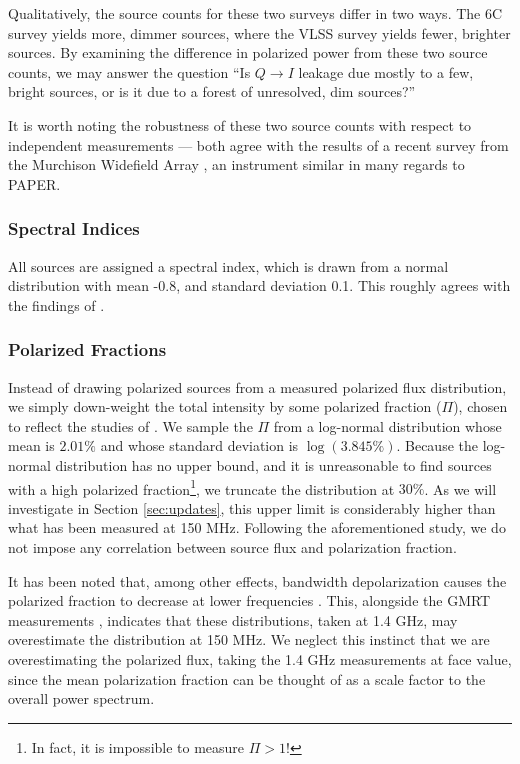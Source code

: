 Qualitatively, the source counts for these two surveys differ in two ways. The 6C survey yields
more, dimmer sources, where the VLSS survey yields fewer, brighter sources. By examining the
difference in polarized power from these two source counts, we may answer the question ``Is $Q\to I$
leakage due mostly to a few, bright sources, or is it due to a forest of unresolved, dim sources?''

It is worth noting the robustness of these two source counts with respect to independent
measurements --- both agree with the results of a recent survey from the Murchison Widefield Array
\cite{Williams2012}, an instrument similar in many regards to PAPER.

\subsubsection*{Spectral Indices}
All sources are assigned a spectral index, which is drawn from a normal distribution with mean -0.8,
and standard deviation 0.1. This roughly agrees with the findings of \citet{Helmboldt2008}.

\subsubsection*{Polarized Fractions}
Instead of drawing polarized sources from a measured polarized flux distribution, we simply
down-weight the total intensity by some polarized fraction ($\Pi$), chosen to reflect the studies 
of \citet{Tucci2012}. We sample the $\Pi$ from a log-normal distribution whose mean is $2.01\%$ and
whose standard deviation is $\log(3.845\%)$. Because the log-normal distribution has no upper bound,
and it is unreasonable to find sources with a high polarized fraction\footnote{In fact, it is
impossible to measure $\Pi > 1$!}, we truncate the distribution at $30\%$. As we will investigate in
Section \ref{sec:updates}, this upper limit is considerably higher than what has been measured
at 150 MHz. Following the aforementioned study, we do not impose any correlation between source flux
and polarization fraction.

It has been noted that, among other effects, bandwidth depolarization causes the polarized fraction
to decrease at lower frequencies \cite{Law2011}. This, alongside the GMRT measurements
\cite{Pen2009}, indicates that these distributions, taken at 1.4 GHz, may overestimate the
distribution at 150 MHz. We neglect this instinct that we are overestimating the polarized flux,
taking the 1.4 GHz measurements at face value, since the mean polarization fraction can be thought
of as a scale factor to the overall power spectrum.

